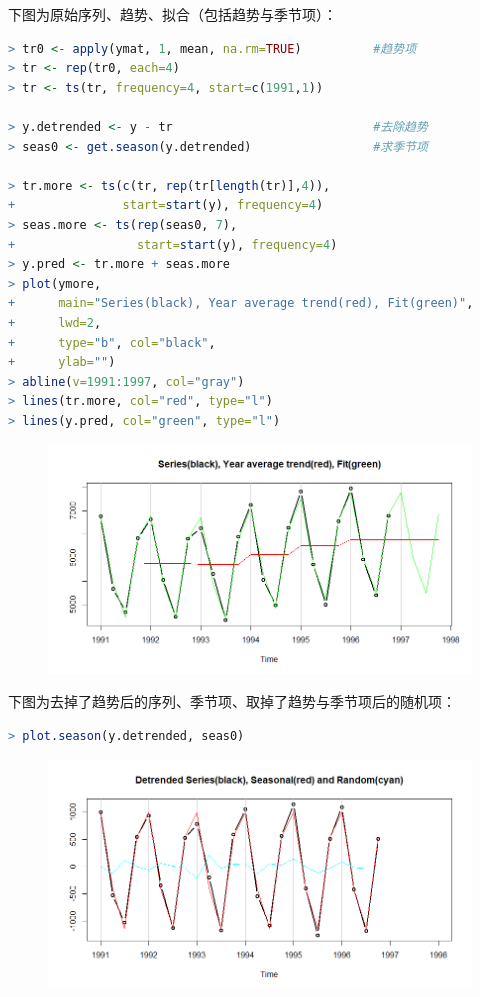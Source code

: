 \documentclass[11pt,a4paper,oneside]{book}
\begin{document}
下图为原始序列、趋势、拟合（包括趋势与季节项）：
\begin{lstlisting}[language=r]
> tr0 <- apply(ymat, 1, mean, na.rm=TRUE)          #趋势项
> tr <- rep(tr0, each=4)
> tr <- ts(tr, frequency=4, start=c(1991,1))

> y.detrended <- y - tr                            #去除趋势
> seas0 <- get.season(y.detrended)                 #求季节项

> tr.more <- ts(c(tr, rep(tr[length(tr)],4)),
+               start=start(y), frequency=4)
> seas.more <- ts(rep(seas0, 7),
+                 start=start(y), frequency=4)
> y.pred <- tr.more + seas.more
> plot(ymore,
+      main="Series(black), Year average trend(red), Fit(green)",
+      lwd=2,
+      type="b", col="black",
+      ylab="")
> abline(v=1991:1997, col="gray")
> lines(tr.more, col="red", type="l")
> lines(y.pred, col="green", type="l")
\end{lstlisting}
\begin{figure}[H]
	\centering
	\includegraphics[width=\textwidth]{3.png}
\end{figure}

下图为去掉了趋势后的序列、季节项、取掉了趋势与季节项后的随机项：
\begin{lstlisting}[language=r]
> plot.season(y.detrended, seas0)
\end{lstlisting}
\begin{figure}[H]
	\centering
	\includegraphics[width=\textwidth]{4.png}
\end{figure}
\end{document}

